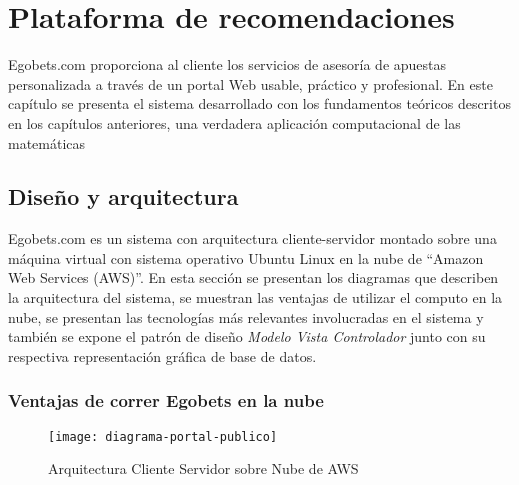 \chapter{Plataforma de recomendaciones}
\label{chap:software}
\graphicspath{{/Users/brunomedina/Dropbox/Tesis-Egobets/egobets-notas/resources/diagramas/}}

Egobets.com proporciona al cliente los servicios de asesoría de apuestas personalizada a través de un portal Web usable, práctico y profesional. En este capítulo se presenta el sistema desarrollado con los fundamentos teóricos descritos en los capítulos anteriores, una verdadera aplicación computacional de las matemáticas





\section{Diseño y arquitectura}
\label{sec:design}
Egobets.com es un sistema con arquitectura cliente-servidor montado sobre una máquina virtual con sistema operativo Ubuntu Linux en la nube de ``Amazon Web Services (AWS)''. En esta sección se presentan los diagramas que describen la arquitectura del sistema, se muestran las ventajas de utilizar el computo en la nube, se presentan las tecnologías más relevantes involucradas en el sistema y también se expone el patrón de diseño \textit{Modelo Vista Controlador} junto con su respectiva representación gráfica de base de datos.
\subsection{Ventajas de correr Egobets en la nube}
\begin{figure}[!htb]\centering
   \begin {minipage}{1\textwidth}
     \texttt{[image: diagrama-portal-publico]}
     \caption{Arquitectura Cliente Servidor sobre Nube de AWS}\label{Fig:diagrama-portal-publico}
   \end{minipage}
\end{figure}


